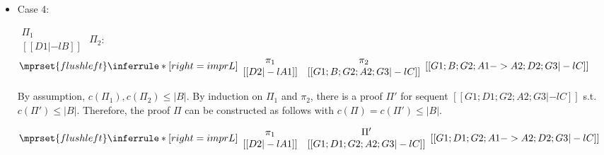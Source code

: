 \begin{itemize}
\item Case 4:
      \begin{center}
        \scriptsize
        \begin{math}
          \begin{array}{c}
            \Pi_1 \\
            {[[D1 |-l B]]}
          \end{array}
        \end{math}
        \qquad\qquad
        $\Pi_2$:
        \begin{math}
          $$\mprset{flushleft}
          \inferrule* [right={\tiny imprL}] {
            {
              \begin{array}{cc}
                \pi_1 & \pi_2 \\
                {[[D2 |-l A1]]} & {[[G1; B; G2; A2; G3 |-l C]]}
              \end{array}
            }
          }{[[G1; B; G2; A1 -> A2; D2; G3 |-l C]]}
        \end{math}
      \end{center}
      By assumption, $c(\Pi_1),c(\Pi_2)\leq |B|$. By induction on $\Pi_1$
      and $\pi_2$, there is a proof $\Pi'$ for sequent
      $[[G1; D1; G2; A2; G3 |-l C]]$ s.t. $c(\Pi') \leq |B|$. Therefore,
      the proof $\Pi$ can be constructed as follows with
      $c(\Pi) = c(\Pi') \leq |B|$.
      \begin{center}
        \scriptsize
        \begin{math}
          $$\mprset{flushleft}
          \inferrule* [right={\tiny imprL}] {
            {
              \begin{array}{cc}
                \pi_1 & \Pi' \\
                {[[D2 |-l A1]]} & {[[G1; D1; G2; A2; G3 |-l C]]}
              \end{array}
            }
          }{[[G1; D1; G2; A1 -> A2; D2; G3 |-l C]]}
        \end{math}
      \end{center}


\end{itemize}
